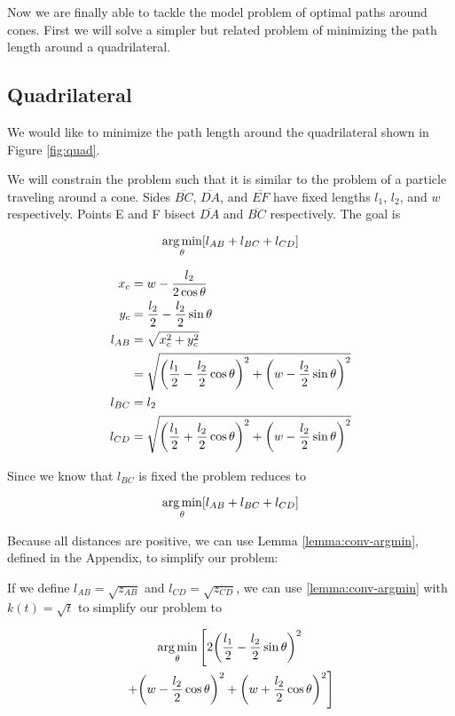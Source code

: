 Now we are finally able to tackle the model problem of optimal paths around cones. First we will solve a simpler but related problem of minimizing the path length around a quadrilateral.

\subsection{Quadrilateral}

We would like to minimize the path length around the quadrilateral shown in Figure \ref{fig:quad}.


We will constrain the problem such that it is similar to the problem of a particle traveling around a cone. Sides $\overline{BC}$, $\overline{DA}$, and $\overline{EF}$ have fixed lengths $l_1$, $l_2$, and $w$ respectively. Points E and F bisect $\overline{DA}$ and $\overline{BC}$ respectively. The goal is

\[
\argmin_{\theta} \bracket{l_{AB} + l_{BC} + l_{CD}}
\]

\begin{align}
  x_c& = w - \frac{l_2}{2 \cos{\theta}}\\
  y_c& = \frac{l_2}{2} - \frac{l_2}{2} \sin{\theta}\\
  l_{AB}& = \sqrt{x_c^2 + y_c^2}\\
        & = \sqrt{ \paren{\frac{l_1}{2} - \frac{l_2}{2} \cos\theta}^2 + \paren{w - \frac{l_2}{2} \sin\theta}^2 }\\
  l_{BC}& = l_2\\
  l_{CD}& = \sqrt{\paren{\frac{l_1}{2} + \frac{l_2}{2} \cos\theta}^2 + \paren{w - \frac{l_2}{2} \sin\theta}^2 }
\end{align}

Since we know that $l_{BC}$ is fixed the problem reduces to

\[
\argmin_{\theta} \bracket{l_{AB} + l_{BC} + l_{CD}}
\]

Because all distances are positive, we can use Lemma \ref{lemma:conv-argmin}, defined in the Appendix, to simplify our problem:

If we define $l_{AB} = \sqrt{z_{AB}}$ and $l_{CD} = \sqrt{z_{CD}}$, we can use \ref{lemma:conv-argmin} with $k(t) = \sqrt{t}$ to simplify our problem to

\begin{multline}
  \argmin_{\theta} \left[ 2\paren{\frac{l_1}{2} - \frac{l_2}{2} \sin\theta}^2 \right.\\
  \left. + \paren{w - \frac{l_2}{2} \cos\theta}^2 + \paren{w + \frac{l_2}{2} \cos\theta}^2 \right]
\end{multline}

